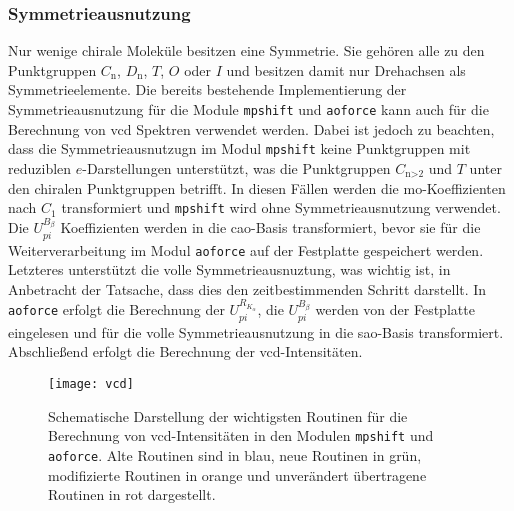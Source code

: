 	\subsubsection{Symmetrieausnutzung}
	Nur wenige chirale Moleküle besitzen eine Symmetrie. Sie gehören alle zu den Punktgruppen $C_{\textrm{n}}$, $D_{\textrm{n}}$, $T$, $O$ oder $I$ und besitzen damit nur Drehachsen als Symmetrieelemente. Die bereits bestehende Implementierung der Symmetrieausnutzung\supercite{haser1991molecular} für die Module \texttt{mpshift} und \texttt{aoforce} kann auch für die Berechnung von \ac{vcd} Spektren verwendet werden. Dabei ist jedoch zu beachten, dass die Symmetrieausnutzugn im Modul \texttt{mpshift} keine Punktgruppen mit reduziblen $e$-Darstellungen unterstützt, was die Punktgruppen $C_{\textrm{n>2}}$ und $T$ unter den chiralen Punktgruppen betrifft. In diesen Fällen werden die \ac{mo}-Koeffizienten nach $C_1$ transformiert und \texttt{mpshift} wird ohne Symmetrieausnutzung verwendet. Die $U_{pi}^{B_\beta}$ Koeffizienten werden in die \ac{cao}-Basis transformiert, bevor sie für die Weiterverarbeitung im Modul \texttt{aoforce} auf der Festplatte gespeichert werden. Letzteres unterstützt die volle Symmetrieausnuztung, was wichtig ist, in Anbetracht der Tatsache, dass dies den zeitbestimmenden Schritt darstellt. In \texttt{aoforce} erfolgt die Berechnung der $U_{pi}^{R_{K_\alpha}}$, die $U_{pi}^{B_\beta}$ werden von der Festplatte eingelesen und für die volle Symmetrieausnutzung in die \ac{sao}-Basis transformiert. Abschließend erfolgt die Berechnung der \ac{vcd}-Intensitäten.
	 
\vfill
\newpage	
\begin{figure}[ht!]
	\centering
	\texttt{[image: vcd]}
	\captionsetup{figurewithin = chapter}
	\captionsetup{font=small, labelfont=bf}\caption[Wichtigste Routinen für die Berechnung von VCD-Intensitäten]{Schematische Darstellung der wichtigsten Routinen für die Berechnung von \ac{vcd}-Intensitäten in den Modulen \texttt{mpshift} und \texttt{aoforce}. Alte Routinen sind in blau, neue Routinen in grün, modifizierte Routinen in orange und unverändert übertragene Routinen in rot dargestellt.}
\label{abb:programmstrukur_vcd}
\end{figure}
	
\FloatBarrier
\vfill
\newpage
